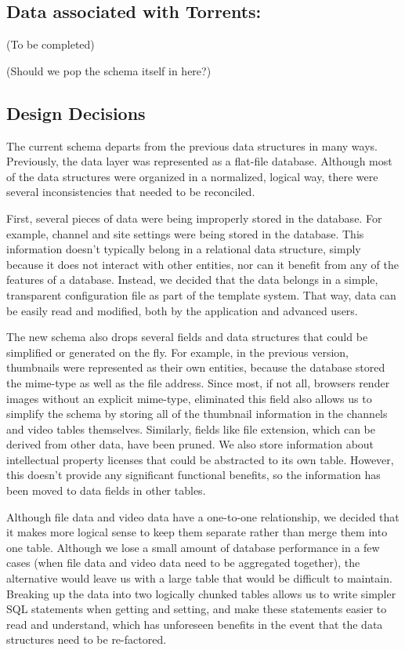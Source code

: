 \documentclass[a4paper,12pt]{report}
\begin{document}
\subsection{Data associated with Torrents:}
(To be completed)

(Should we pop the schema itself in here?)

\subsection{Design Decisions}
The current schema departs from the previous data structures in many ways. Previously, the data layer was represented as a flat-file database. 
Although most of the data structures were organized in a normalized, logical way, there were several inconsistencies that needed to be reconciled.

First, several pieces of data were being improperly stored in the database. For example, channel and site settings were being stored in the database. This information doesn't typically belong in a relational data structure, simply because it does not interact with other entities, nor can it benefit from any of the features of a database. 
Instead, we decided that the data belongs in a simple, transparent configuration file as part of the template system. 
That way, data can be easily read and modified, both by the application and advanced users. 

The new schema also drops several fields and data structures that could be simplified or generated on the fly. 
For example, in the previous version, thumbnails were represented as their own entities, because the database stored the mime-type as well as the file address. 
Since most, if not all, browsers render images without an explicit mime-type, eliminated this field also allows us to simplify the schema by storing all of the thumbnail information in the channels and video tables themselves. Similarly, fields like file extension, which can be derived from other data, have been pruned. 
We also store information about intellectual property licenses that could be abstracted to its own table. 
However, this doesn't provide any significant functional benefits, so the information has been moved to data fields in other tables.

Although file data and video data have a one-to-one relationship, we decided that it makes more logical sense to keep them separate rather than merge them into one table. 
Although we lose a small amount of database performance in a few cases (when file data and video data need to be aggregated together), the alternative would leave us with a large table that would be difficult to maintain. Breaking up the data into two logically chunked tables allows us to write simpler SQL statements when getting and setting, and make these statements easier to read and understand, which has unforeseen benefits in the event that the data structures need to be re-factored.
\end{document}
